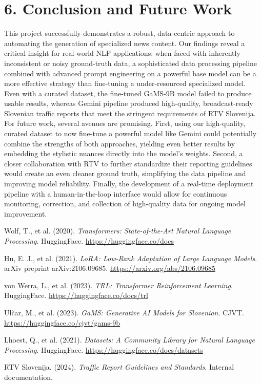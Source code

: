 \documentclass[fleqn,moreauthors,10pt]{ds_report}
\begin{document}
\section*{6. Conclusion and Future Work}
This project successfully demonstrates a robust, data-centric approach to automating the generation of specialized news content. Our findings reveal a critical insight for real-world NLP applications: when faced with inherently inconsistent or noisy ground-truth data, a sophisticated data processing pipeline combined with advanced prompt engineering on a powerful base model can be a more effective strategy than fine-tuning a under-resourced specialized model. Even with a curated dataset, the fine-tuned GaMS-9B model failed to produce usable results, whereas Gemini pipeline produced high-quality, broadcast-ready Slovenian traffic reports that meet the stringent requirements of RTV Slovenija.
For future work, several avenues are promising. First, using our high-quality, curated dataset to now fine-tune a powerful model like Gemini could potentially combine the strengths of both approaches, yielding even better results by embedding the stylistic nuances directly into the model's weights. Second, a closer collaboration with RTV to further standardize their reporting guidelines would create an even cleaner ground truth, simplifying the data pipeline and improving model reliability. Finally, the development of a real-time deployment pipeline with a human-in-the-loop interface would allow for continuous monitoring, correction, and collection of high-quality data for ongoing model improvement.


\begin{thebibliography}{9}

Wolf, T., et al. (2020).
\textit{Transformers: State-of-the-Art Natural Language Processing}.
HuggingFace.
\url{https://huggingface.co/docs}

Hu, E. J., et al. (2021).
\textit{LoRA: Low-Rank Adaptation of Large Language Models}.
arXiv preprint arXiv:2106.09685.
\url{https://arxiv.org/abs/2106.09685}

von Werra, L., et al. (2023).
\textit{TRL: Transformer Reinforcement Learning}.
HuggingFace.
\url{https://huggingface.co/docs/trl}

Ulčar, M., et al. (2023).
\textit{GaMS: Generative AI Models for Slovenian}.
CJVT.
\url{https://huggingface.co/cjvt/gams-9b}

Lhoest, Q., et al. (2021).
\textit{Datasets: A Community Library for Natural Language Processing}.
HuggingFace.
\url{https://huggingface.co/docs/datasets}

RTV Slovenija. (2024).
\textit{Traffic Report Guidelines and Standards}.
Internal documentation.

\end{thebibliography}
\end{document}
